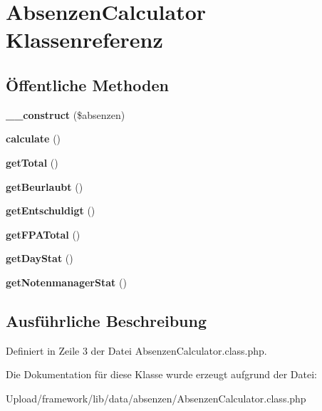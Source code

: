 \hypertarget{class_absenzen_calculator}{}\section{Absenzen\+Calculator Klassenreferenz}
\label{class_absenzen_calculator}
\subsection*{Öffentliche Methoden}
\begin{DoxyCompactItemize}
\item 
\mbox{\label{class_absenzen_calculator_a4912cf3897ab979d067f1f3f5e3fa9cf}} 
{\bfseries \+\_\+\+\_\+construct} (\$absenzen)
\item 
\mbox{\label{class_absenzen_calculator_aebced7880846456437dc3e80d267ab67}} 
{\bfseries calculate} ()
\item 
\mbox{\label{class_absenzen_calculator_ac701a1d1c6267e4fdd36c85ecf524d5a}} 
{\bfseries get\+Total} ()
\item 
\mbox{\label{class_absenzen_calculator_aa9ace2d4983aad4ee89d35e5fbb2c338}} 
{\bfseries get\+Beurlaubt} ()
\item 
\mbox{\label{class_absenzen_calculator_a7781cbf2473cd12393c881c4a2cb1bdf}} 
{\bfseries get\+Entschuldigt} ()
\item 
\mbox{\label{class_absenzen_calculator_a41d1d574243749ffd5c04bd686b3e89d}} 
{\bfseries get\+F\+P\+A\+Total} ()
\item 
\mbox{\label{class_absenzen_calculator_a63728d5f139a8791c7c6dccbaf6a02ce}} 
{\bfseries get\+Day\+Stat} ()
\item 
\mbox{\label{class_absenzen_calculator_ad0550404d2eb7c28c7defdf890ce4903}} 
{\bfseries get\+Notenmanager\+Stat} ()
\end{DoxyCompactItemize}


\subsection{Ausführliche Beschreibung}


Definiert in Zeile 3 der Datei Absenzen\+Calculator.\+class.\+php.



Die Dokumentation für diese Klasse wurde erzeugt aufgrund der Datei\+:\begin{DoxyCompactItemize}
\item 
Upload/framework/lib/data/absenzen/Absenzen\+Calculator.\+class.\+php\end{DoxyCompactItemize}
